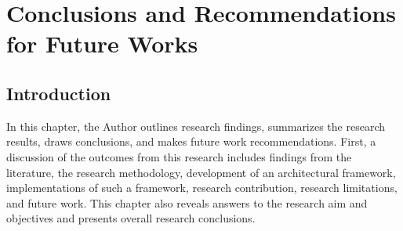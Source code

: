 \chapter{Conclusions and Recommendations for Future Works}
\label{chapter5}
\section{Introduction}
In this chapter, the Author outlines research findings, summarizes the research results, draws conclusions, and makes future work recommendations. First, a discussion of the outcomes from this research includes findings from the literature, the research methodology, development of an architectural framework, implementations of such a framework, research contribution, research limitations, and future work. This chapter also reveals answers to the research aim and objectives and presents overall research conclusions.
